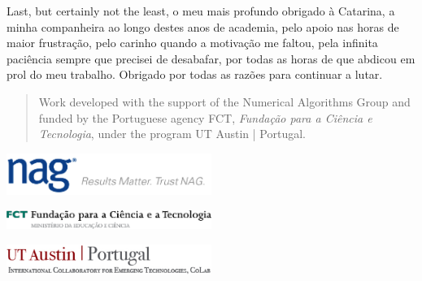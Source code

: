 \documentclass[../extabst]{subfiles}
\begin{document}
	Last, but certainly not the least, o meu mais profundo obrigado à Catarina, a minha companheira ao longo destes anos de academia, pelo apoio nas horas de maior frustração, pelo carinho quando a motivação me faltou, pela infinita paciência sempre que precisei de desabafar, por todas as horas de que abdicou em prol do meu trabalho. Obrigado por todas as razões para continuar a lutar.

	\vfill

	\begin{quote}
		Work developed with the support of the Numerical Algorithms Group and funded by the Portuguese agency FCT, \textit{Fundação para a Ciência e Tecnologia}, under the program UT Austin | Portugal.
	\end{quote}

	\begin{center}
		\includegraphics[width=0.5\textwidth]{assets/images/nag.png}

		\includegraphics[width=0.5\textwidth]{assets/images/fct.png}
		
		\includegraphics[width=0.5\textwidth]{assets/images/utaustin.png}
	\end{center}
\end{document}

